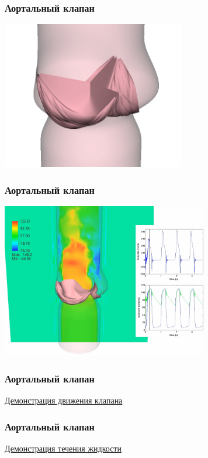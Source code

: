\documentclass[14pt]{beamer}
\begin{document}
\begin{frame}
\frametitle{Аортальный клапан}
    \begin{center}
	\includegraphics[width=8cm]{immersed_boundary/valve_vessel_side_crop.jpg}
    \end{center}
\end{frame}

\begin{frame}
\frametitle{Аортальный клапан}
    \begin{center}
	\includegraphics[width=9cm]{immersed_boundary/shot0002.png}
    \end{center}
\end{frame}

\begin{frame}
\frametitle{Аортальный клапан}
    \begin{center}
        \href{run:video/valve\_top.mov}{Демонстрация движения клапана}
    \end{center}
\end{frame}

\begin{frame}
\frametitle{Аортальный клапан}
    \begin{center}
        \href{run:video/valve\_flow\_side.mov}{Демонстрация течения жидкости}
    \end{center}
\end{frame}
\end{document}
